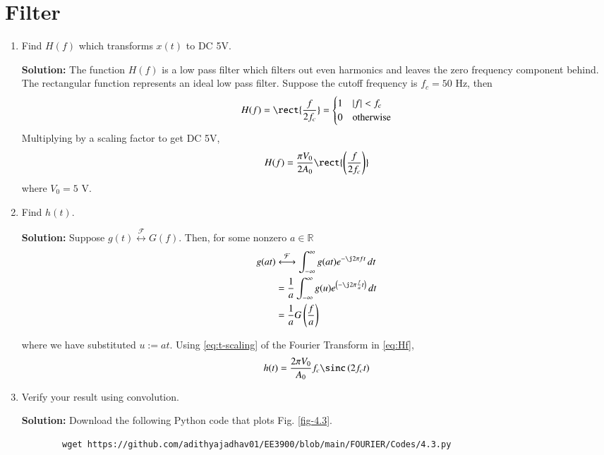 \documentclass[journal,12pt,twocolumn]{IEEEtran}
\newcommand{\solution}{\noindent \textbf{Solution: }}
\providecommand{\brak}[1]{\ensuremath{\left(#1\right)}}
\providecommand{\abs}[1]{\left\vert#1\right\vert}
\providecommand{\system}[1]{\overset{\mathcal{#1}}{ \longleftrightarrow}}
\numberwithin{equation}{section}
\numberwithin{figure}{section}
\renewcommand\thesection{\arabic{section}}
\begin{document}
\section{Filter}
\begin{enumerate}[label=\thesection.\arabic*
,ref=\thesection.\theenumi]
\item Find $H(f)$ which transforms $x(t)$ to DC 5V.

\solution The function $H(f)$ is a low pass filter which filters out
even harmonics and leaves the zero frequency component behind.
The rectangular function represents an ideal low pass filter. 
Suppose the cutoff frequency is $f_c = 50$ Hz, then
\begin{align}
    H(f) = \rect{\frac{f}{2f_c}} =
    \begin{cases}
        1 & \abs{f} < f_c \\
        0 & \textrm{otherwise}
    \end{cases}
    \label{eq:Hf}
\end{align}
Multiplying by a scaling factor to get DC 5V,
\begin{align}
    H(f) = \frac{\pi V_0}{2A_0}\rect{\brak{\frac{f}{2f_c}}}
\end{align}
where $V_0 = 5$ V.
\item Find $h(t)$.

\solution Suppose $g(t)\system{F}G(f)$. Then, for some
nonzero $a \in \mathbb{R}$
\begin{align}
    g(at)&\system{F}\int_{-\infty}^{\infty}g(at)e^{-\j2\pi ft}\, dt \\
         &=\frac{1}{a}\int_{-\infty}^{\infty}g(u)e^{\brak{-\j2\pi \frac{f}{a}t}}\, dt \\
         &=\frac{1}{a}G\brak{\frac{f}{a}}
         \label{eq:t-scaling}
\end{align}

where we have substituted $u := at$. Using 
\eqref{eq:t-scaling} of the Fourier Transform in \eqref{eq:Hf},
\begin{align}
    h(t) = \frac{2\pi V_0}{A_0}f_c\sinc\brak{2f_ct}
\end{align}

\item Verify your result using convolution.

\solution 
Download the following Python code that plots Fig. \ref{fig-4.3}.
	\begin{lstlisting}
		wget https://github.com/adithyajadhav01/EE3900/blob/main/FOURIER/Codes/4.3.py
	\end{lstlisting}
	

\end{enumerate}
\end{document}
